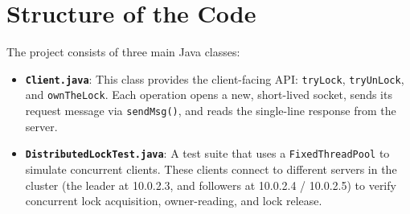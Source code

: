 \documentclass[a4paper,11pt]{article}
\begin{document}
\section{Structure of the Code}
The project consists of three main Java classes:

\begin{itemize}
    \item \textbf{\texttt{Client.java}}: This class provides the client-facing API: \texttt{tryLock}, \texttt{tryUnLock}, and \texttt{ownTheLock}. Each operation opens a new, short-lived socket, sends its request message via \texttt{sendMsg()}, and reads the single-line response from the server.

    \item \textbf{\texttt{DistributedLockTest.java}}: A test suite that uses a \texttt{FixedThreadPool} to simulate concurrent clients. These clients connect to different servers in the cluster (the leader at 10.0.2.3, and followers at 10.0.2.4 / 10.0.2.5) to verify concurrent lock acquisition, owner-reading, and lock release.
    

\end{itemize}
\end{document}
